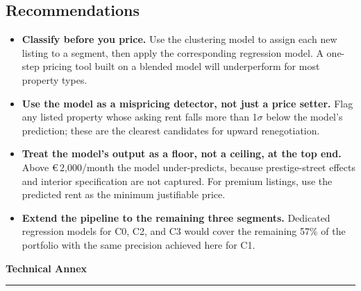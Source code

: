 \documentclass[10pt,a4paper,twocolumn]{article}
\newcommand{\eur}[1]{€\,#1}
\begin{document}
\subsection{Recommendations}
\begin{itemize}
    \item \textbf{Classify before you price.} Use the clustering model to assign each new listing to a segment, then apply the corresponding regression model. A one-step pricing tool built on a blended model will underperform for most property types.
    \item \textbf{Use the model as a mispricing detector, not just a price setter.} Flag any listed property whose asking rent falls more than 1$\sigma$ below the model's prediction; these are the clearest candidates for upward renegotiation.
    \item \textbf{Treat the model's output as a floor, not a ceiling, at the top end.} Above \eur{2,000}/month the model under-predicts, because prestige-street effects and interior specification are not captured. For premium listings, use the predicted rent as the minimum justifiable price.
    \item \textbf{Extend the pipeline to the remaining three segments.} Dedicated regression models for C0, C2, and C3 would cover the remaining 57\% of the portfolio with the same precision achieved here for C1.
\end{itemize}








\onecolumn
\newpage
\thispagestyle{fancy}

\setlength{\textfloatsep}{4pt plus 2pt minus 2pt}
\setlength{\floatsep}{4pt plus 2pt minus 2pt}
\setlength{\intextsep}{4pt plus 2pt minus 2pt}
\titlespacing*{\subsection}{0pt}{6pt}{3pt}

\setcounter{table}{0}
\renewcommand{\thetable}{A\arabic{table}}
\setcounter{figure}{0}
\renewcommand{\thefigure}{A\arabic{figure}}

\begin{center}
{\Large\bfseries\color{mbdsblue} Technical Annex}\\[2pt]
\rule{0.5\textwidth}{0.4pt}
\end{center}
\vspace{0.1cm}
\end{document}
